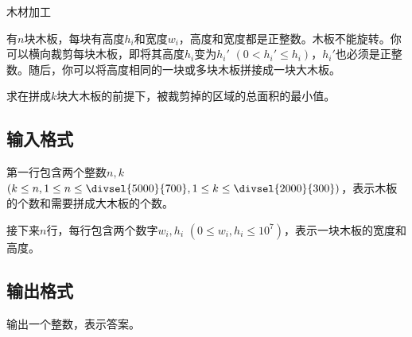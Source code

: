 \begin{Problem}{木材加工}{}

有$n$块木板，每块有高度$h_i$和宽度$w_i$，高度和宽度都是正整数。木板不能旋转。你可以横向裁剪每块木板，即将其高度$h_i$变为$h_i'$ $(0 < h_i' \leq h_i)$，$h_i'$也必须是正整数。随后，你可以将高度相同的一块或多块木板拼接成一块大木板。

求在拼成$k$块大木板的前提下，被裁剪掉的区域的总面积的最小值。

\subsection*{输入格式}

第一行包含两个整数$n, k$ $(k \leq n, 1 \leq n \leq \divsel{5000}{700}, 1 \leq k \leq \divsel{2000}{300})$，表示木板的个数和需要拼成大木板的个数。

接下来$n$行，每行包含两个数字$w_i, h_i$ $(0 \leq w_i, h_i \leq 10^7)$，表示一块木板的宽度和高度。

\subsection*{输出格式}

输出一个整数，表示答案。


\end{Problem}

